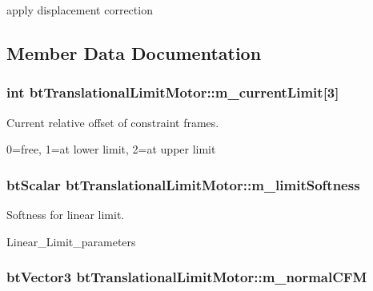 apply displacement correction 

\subsection{Member Data Documentation}
\hypertarget{classbt_translational_limit_motor_a10c82797a218fd20026256f9e69b9b62}{
\subsubsection[{m\+\_\+current\+Limit}]{\setlength{\rightskip}{0pt plus 5cm}int bt\+Translational\+Limit\+Motor\+::m\+\_\+current\+Limit\mbox{[}3\mbox{]}}}\label{classbt_translational_limit_motor_a10c82797a218fd20026256f9e69b9b62}


Current relative offset of constraint frames. 

0=free, 1=at lower limit, 2=at upper limit \hypertarget{classbt_translational_limit_motor_aa557a6c4d83ca5cb5a942f8f4b236f74}{
\subsubsection[{m\+\_\+limit\+Softness}]{\setlength{\rightskip}{0pt plus 5cm}bt\+Scalar bt\+Translational\+Limit\+Motor\+::m\+\_\+limit\+Softness}}\label{classbt_translational_limit_motor_aa557a6c4d83ca5cb5a942f8f4b236f74}


Softness for linear limit. 

Linear\+\_\+\+Limit\+\_\+parameters \hypertarget{classbt_translational_limit_motor_a8970a726c2b50a0c60c0c8e079cc784f}{
\subsubsection[{m\+\_\+normal\+C\+F\+M}]{\setlength{\rightskip}{0pt plus 5cm}bt\+Vector3 bt\+Translational\+Limit\+Motor\+::m\+\_\+normal\+C\+F\+M}}\label{classbt_translational_limit_motor_a8970a726c2b50a0c60c0c8e079cc784f}


